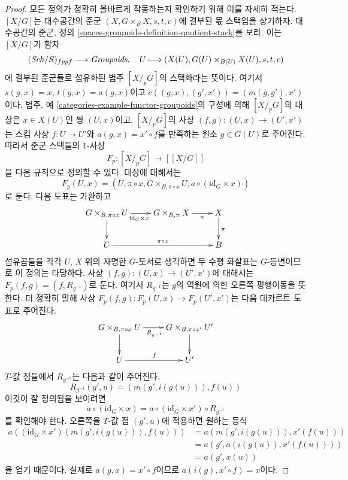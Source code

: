 \begin{proof}
모든 정의가 정확히 올바르게 작동하는지 확인하기 위해 이를 자세히 적는다.
$[X/G]$는 대수공간의 준군 $(X, G \times_B X, s, t, c)$에 결부된 몫
스택임을 상기하자. 대수공간의 준군, 정의
\ref{spaces-groupoids-definition-quotient-stack}를 보라. 이는 $[X/G]$가 함자
$$
(\mathit{Sch}/S)_{fppf} \longrightarrow \textit{Groupoids},
\quad
U \longmapsto (X(U), G(U) \times_{B(U)} X(U), s, t, c)
$$
에 결부된 준군들로 섬유화된 범주 $[X/_{\!p}G]$의 스택화라는 뜻이다.
여기서 $s(g, x) = x$, $t(g, x) = a(g, x)$이고
$c((g, x), (g', x')) = (m(g, g'), x')$이다. 범주, 예
\ref{categories-example-functor-groupoids}의 구성에 의해
$[X/_{\!p}G]$의 대상은 $x \in X(U)$인 쌍 $(U, x)$이고,
$[X/_{\!p}G]$의 사상 $(f, g) : (U, x) \to (U', x')$는 스킴 사상
$f : U \to U'$와 $a(g, x) = x' \circ f$를 만족하는 원소 $g \in G(U)$로
주어진다. 따라서 준군 스택들의 $1$-사상
$$
F_p : [X/_{\!p}G] \longrightarrow [[X/G]]
$$
을 다음 규칙으로 정의할 수 있다. 대상에 대해서는
$$
F_p(U, x) =
(U, \pi \circ x, G \times_{B, \pi \circ x} U, a \circ (\text{id}_G \times x))
$$
로 둔다. 다음 도표는 가환하고
$$
\xymatrix{
G \times_{B, \pi \circ x} U \ar[d] \ar[r]_{\text{id}_G \times x} &
G \times_{B, \pi} X \ar[r]_-a &
X \ar[d]^\pi \\
U \ar[rr]^{\pi \circ x} & & B
}
$$
섬유곱들을 각각 $U$, $X$ 위의 자명한 $G$-토서로 생각하면 두 수평 화살표는
$G$-등변이므로 이 정의는 타당하다. 사상
$(f, g) : (U, x) \to (U', x')$에 대해서는
$F_p(f, g) = (f, R_{g^{-1}})$로 둔다. 여기서 $R_{g^{-1}}$는 $g$의 역원에
의한 오른쪽 평행이동을 뜻한다. 더 정확히 말해 사상
$F_p(f, g) : F_p(U, x) \to F_p(U', x')$는 다음 데카르트 도표로 주어진다.
$$
\xymatrix{
G \times_{B, \pi \circ x} U \ar[d] \ar[r]_{R_{g^{-1}}} &
G \times_{B, \pi \circ x'} U' \ar[d] \\
U \ar[r]^f & U'
}
$$
$T$-값 점들에서 $R_{g^{-1}}$는 다음과 같이 주어진다.
$$
R_{g^{-1}}(g', u) = (m(g', i(g(u))), f(u))
$$
이것이 잘 정의됨을 보이려면
$$
a \circ (\text{id}_G \times x)
=
a \circ (\text{id}_G \times x') \circ R_{g^{-1}}
$$
를 확인해야 한다. 오른쪽을 $T$-값 점 $(g', u)$에 적용하면 원하는 등식
\begin{align*}
a((\text{id}_G \times x')(m(g', i(g(u))), f(u)))
& =
a(m(g', i(g(u))), x'(f(u))) \\
& =
a(g', a(i(g(u)), x'(f(u)))) \\
& =
a(g', x(u))
\end{align*}
을 얻기 때문이다. 실제로 $a(g, x) = x' \circ f$이므로
$a(i(g), x' \circ f) = x$이다.


\end{proof}
